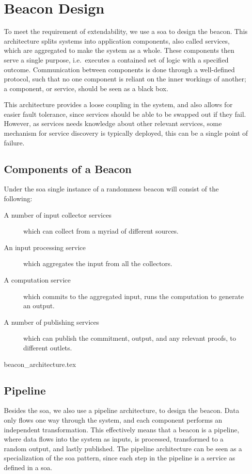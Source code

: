 \section{Beacon Design}

To meet the requirement of extendability, we use a \gls{soa} to design the beacon.
This architecture splits systems into application components, also called services, which are aggregated to make the system as a whole.
These components then serve a single purpose, i.e.\ executes a contained set of logic with a specified outcome.
Communication between components is done through a well-defined protocol, such that no one component is reliant on the inner workings of another;
a component, or service, should be seen as a black box.

This architecture provides a loose coupling in the system, and also allows for easier fault tolerance, since services should be able to be swapped out if they fail.
However, as services needs knowledge about other relevant services, some mechanism for service discovery is typically deployed, this can be a single point of failure.

\subsection{Components of a Beacon}
\label{sub:components_of_a_beacon}
Under the \gls{soa} single instance of a randomness beacon will consist of the following:
\begin{description}
    \item[A number of input collector services] which can collect from a myriad of different sources.
    \item[An input processing service] which aggregates the input from all the collectors.
    \item[A computation service] which commits to the aggregated input, runs the computation to generate an output.
    \item[A number of publishing services] which can publish the commitment, output, and any relevant proofs, to different outlets.
\end{description}

{beacon_architecture.tex}

\subsection{Pipeline}%
\label{sub:pipeline}
Besides the \gls{soa}, we also use a pipeline architecture, to design the beacon.
Data only flows one way through the system, and each component performs an independent transformation.
This effectively means that a beacon is a pipeline, where data flows into the system as inputs, is processed, transformed to a random output, and lastly published.
The pipeline architecture can be seen as a specialization of the \gls{soa} pattern, since each step in the pipeline is a service as defined in a \gls{soa}.

